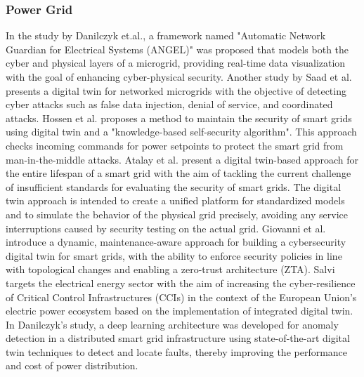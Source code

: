 \subsubsection{Power Grid}
In the study by Danilczyk et.al.\cite{williamdanilczykANGELIntelligentDigital2019}, a framework named "Automatic Network Guardian for Electrical Systems (ANGEL)" was proposed that models both the cyber and physical layers of a microgrid, providing real-time data visualization with the goal of enhancing cyber-physical security. Another study by Saad et al.\cite{saadImplementationIoTBasedDigital2020} presents a digital twin for networked microgrids with the objective of detecting cyber attacks such as false data injection, denial of service, and coordinated attacks. Hossen et al.\cite{hossenDigitalTwinSelfSecurity2021} proposes a method to maintain the security of smart grids using digital twin and a "knowledge-based self-security algorithm". This approach checks incoming commands for power setpoints to protect the smart grid from man-in-the-middle attacks. Atalay et al.\cite{atalayDigitalTwinsApproach2020} present a digital twin-based approach for the entire lifespan of a smart grid with the aim of tackling the current challenge of insufficient standards for evaluating the security of smart grids. The digital twin approach is intended to create a unified platform for standardized models and to simulate the behavior of the physical grid precisely, avoiding any service interruptions caused by security testing on the actual grid. Giovanni et al.\cite{giovannipaolosellittoEnablingZeroTrust2021} introduce a dynamic, maintenance-aware approach for building a cybersecurity digital twin for smart grids, with the ability to enforce security policies in line with topological changes and enabling a zero-trust architecture (ZTA). Salvi \cite{salviCyberresilienceCriticalCyber2022} targets the electrical energy sector with the aim of increasing the cyber-resilience of Critical Control Infrastructures (CCIs) in the context of the European Union's electric power ecosystem based on the implementation of integrated digital twin. In\cite{danilczykSmartGridAnomaly2021} Danilczyk's  study, a deep learning architecture was developed for anomaly detection in a distributed smart grid infrastructure using state-of-the-art digital twin techniques to detect and locate faults, thereby improving the performance and cost of power distribution.  

